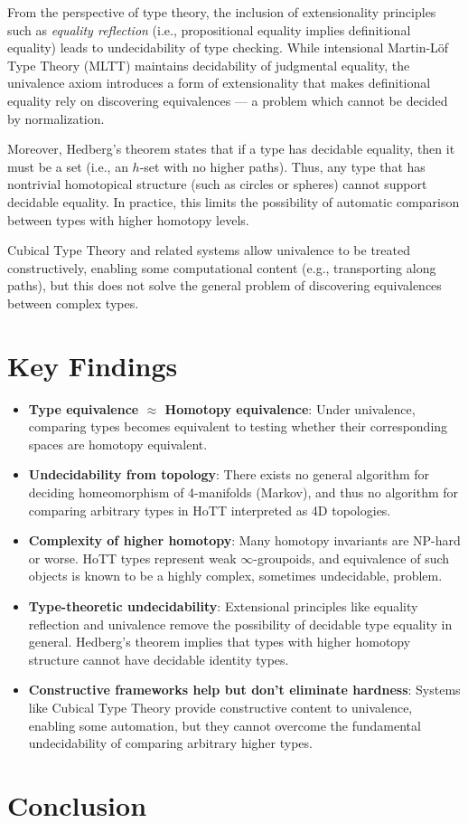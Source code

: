 \documentclass{article}
\begin{document}
From the perspective of type theory, the inclusion of extensionality principles such as \emph{equality reflection} (i.e., propositional equality implies definitional equality) leads to undecidability of type checking. While intensional Martin-Löf Type Theory (MLTT) maintains decidability of judgmental equality, the univalence axiom introduces a form of extensionality that makes definitional equality rely on discovering equivalences --- a problem which cannot be decided by normalization.

Moreover, Hedberg’s theorem states that if a type has decidable equality, then it must be a set (i.e., an $h$-set with no higher paths). Thus, any type that has nontrivial homotopical structure (such as circles or spheres) cannot support decidable equality. In practice, this limits the possibility of automatic comparison between types with higher homotopy levels.

Cubical Type Theory and related systems allow univalence to be treated constructively, enabling some computational content (e.g., transporting along paths), but this does not solve the general problem of discovering equivalences between complex types. 

\section*{Key Findings}

\begin{itemize}
    \item \textbf{Type equivalence $\approx$ Homotopy equivalence}: Under univalence, comparing types becomes equivalent to testing whether their corresponding spaces are homotopy equivalent.
    \item \textbf{Undecidability from topology}: There exists no general algorithm for deciding homeomorphism of 4-manifolds (Markov), and thus no algorithm for comparing arbitrary types in HoTT interpreted as 4D topologies.
    \item \textbf{Complexity of higher homotopy}: Many homotopy invariants are NP-hard or worse. HoTT types represent weak $\infty$-groupoids, and equivalence of such objects is known to be a highly complex, sometimes undecidable, problem.
    \item \textbf{Type-theoretic undecidability}: Extensional principles like equality reflection and univalence remove the possibility of decidable type equality in general. Hedberg’s theorem implies that types with higher homotopy structure cannot have decidable identity types.
    \item \textbf{Constructive frameworks help but don’t eliminate hardness}: Systems like Cubical Type Theory provide constructive content to univalence, enabling some automation, but they cannot overcome the fundamental undecidability of comparing arbitrary higher types.
\end{itemize}

\section*{Conclusion}
\end{document}
